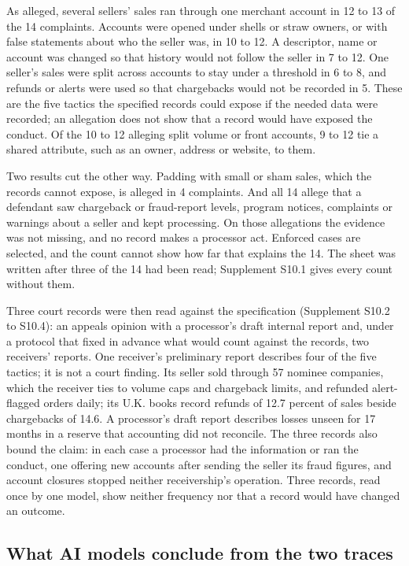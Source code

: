 \documentclass[acmlarge,nonacm]{acmart}
\begin{document}
As alleged, several sellers' sales ran through one merchant account in
12 to 13 of the 14 complaints. Accounts were opened under shells or
straw owners, or with false statements about who the seller was, in 10
to 12. A descriptor, name or account was changed so that history would
not follow the seller in 7 to 12. One seller's sales were split across
accounts to stay under a threshold in 6 to 8, and refunds or alerts were
used so that chargebacks would not be recorded in 5. These are the five
tactics the specified records could expose if the needed data were
recorded; an allegation does not show that a record would have exposed
the conduct. Of the 10 to 12 alleging split volume or front accounts, 9
to 12 tie a shared attribute, such as an owner, address or website, to
them.

Two results cut the other way. Padding with small or sham sales, which
the records cannot expose, is alleged in 4 complaints. And all 14 allege
that a defendant saw chargeback or fraud-report levels, program notices,
complaints or warnings about a seller and kept processing. On those
allegations the evidence was not missing, and no record makes a
processor act. Enforced cases are selected, and the count cannot show
how far that explains the 14. The sheet was written after three of the
14 had been read; Supplement S10.1 gives every count without them.

Three court records were then read against the specification (Supplement
S10.2 to S10.4): an appeals opinion with a processor's draft internal
report and, under a protocol that fixed in advance what would count
against the records, two receivers' reports. One receiver's preliminary
report describes four of the five tactics; it is not a court finding.
Its seller sold through 57 nominee companies, which the receiver ties to
volume caps and chargeback limits, and refunded alert-flagged orders
daily; its U.K. books record refunds of 12.7 percent of sales beside
chargebacks of 14.6. A processor's draft report describes losses unseen
for 17 months in a reserve that accounting did not reconcile. The three
records also bound the claim: in each case a processor had the
information or ran the conduct, one offering new accounts after sending
the seller its fraud figures, and account closures stopped neither
receivership's operation. Three records, read once by one model, show
neither frequency nor that a record would have changed an outcome.

\hypertarget{what-ai-models-conclude-from-the-two-traces}{%
\subsection{What AI models conclude from the two
traces}\label{what-ai-models-conclude-from-the-two-traces}}
\end{document}
